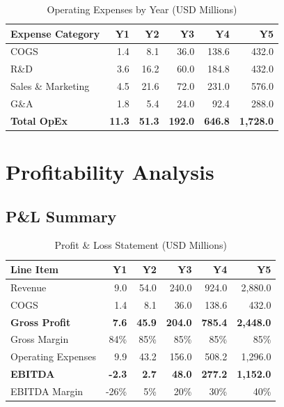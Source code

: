 \begin{table}[H]
\centering
\caption{Operating Expenses by Year (USD Millions)}
\begin{tabular}{|l|r|r|r|r|r|}
\hline
\rowcolor{lightgray}
\textbf{Expense Category} & \textbf{Y1} & \textbf{Y2} & \textbf{Y3} & \textbf{Y4} & \textbf{Y5} \\
\hline
COGS & 1.4 & 8.1 & 36.0 & 138.6 & 432.0 \\
\hline
R\&D & 3.6 & 16.2 & 60.0 & 184.8 & 432.0 \\
\hline
Sales \& Marketing & 4.5 & 21.6 & 72.0 & 231.0 & 576.0 \\
\hline
G\&A & 1.8 & 5.4 & 24.0 & 92.4 & 288.0 \\
\hline
\textbf{Total OpEx} & \textbf{11.3} & \textbf{51.3} & \textbf{192.0} & \textbf{646.8} & \textbf{1,728.0} \\
\hline
\end{tabular}
\end{table}

\section{Profitability Analysis}

\subsection{P\&L Summary}

\begin{table}[H]
\centering
\caption{Profit \& Loss Statement (USD Millions)}
\begin{tabular}{|l|r|r|r|r|r|}
\hline
\rowcolor{lightgray}
\textbf{Line Item} & \textbf{Y1} & \textbf{Y2} & \textbf{Y3} & \textbf{Y4} & \textbf{Y5} \\
\hline
Revenue & 9.0 & 54.0 & 240.0 & 924.0 & 2,880.0 \\
\hline
COGS & 1.4 & 8.1 & 36.0 & 138.6 & 432.0 \\
\hline
\textbf{Gross Profit} & \textbf{7.6} & \textbf{45.9} & \textbf{204.0} & \textbf{785.4} & \textbf{2,448.0} \\
\hline
Gross Margin & 84\% & 85\% & 85\% & 85\% & 85\% \\
\hline
Operating Expenses & 9.9 & 43.2 & 156.0 & 508.2 & 1,296.0 \\
\hline
\textbf{EBITDA} & \textbf{-2.3} & \textbf{2.7} & \textbf{48.0} & \textbf{277.2} & \textbf{1,152.0} \\
\hline
EBITDA Margin & -26\% & 5\% & 20\% & 30\% & 40\% \\
\hline
\end{tabular}
\end{table}


